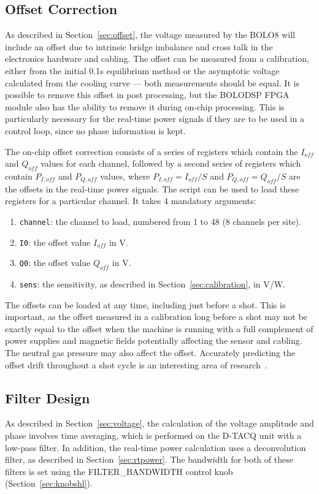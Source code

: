 \documentclass[12pt,a4paper]{article}
\begin{document}
\subsection{Offset Correction}%
\label{sec:offset_correction}
As described in Section~\ref{sec:offset}, the voltage measured by the BOLO8 will include an offset due to intrinsic bridge imbalance and cross talk in the
electronics hardware and cabling. The offset can be measured from a calibration, either from the initial 0.1s equilibrium method or the asymptotic voltage
calculated from the cooling curve --- both measurements should be equal. It is possible to remove this offset in post processing, but the BOLODSP FPGA
module also has the ability to remove it during on-chip processing. This is particularly necessary for the real-time power signals if they are to be used
in a control loop, since no phase information is kept.

The on-chip offset correction consists of a series of registers which contain the $I_{off}$ and $Q_{off}$ values for each channel, followed by a second
series of registers which contain $P_{I,off}$ and $P_{Q,off}$ values, where $P_{I,off} = I_{off}/S$ and $P_{Q,off} = Q_{off}/S$ are the offsets in the
real-time power signals. The script \mbox{} can be used to load these registers for a particular channel. It
takes 4 mandatory arguments:
\begin{enumerate}
\item{\texttt{channel}: the channel to load, numbered from 1 to 48 (8 channels per site).}
\item{\texttt{I0}: the offset value $I_{off}$ in V.}
\item{\texttt{Q0}: the offset value $Q_{off}$ in V.}
\item{\texttt{sens}: the sensitivity, as described in Section~\ref{sec:calibration}, in V/W.}
\end{enumerate}

The offsets can be loaded at any time, including just before a shot. This is important, as the offset measured in a calibration long before a shot may not
be exactly equal to the offset when the machine is running with a full complement of power supplies and magnetic fields potentially affecting the sensor
and cabling. The neutral gas pressure may also affect the offset. Accurately predicting the offset drift throughout a shot cycle is an interesting area of
research~\cite{zhang-2012}.

\subsection{Filter Design}%
\label{sec:lpfdesign}
As described in Section~\ref{sec:voltage}, the calculation of the voltage amplitude and phase involves time averaging, which is performed on the D-TACQ
unit with a low-pass filter. In addition, the real-time power calculation uses a deconvolution filter, as described in Section~\ref{sec:rtpower}. The
bandwidth for both of these filters is set using the FILTER{\_}BANDWIDTH control knob (Section~\ref{sec:knobshl}).
\end{document}
